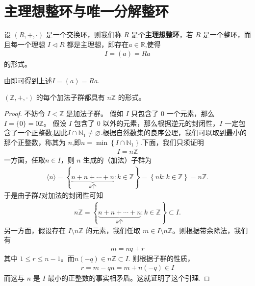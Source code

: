 \documentclass[../../main.tex]{subfiles}
\begin{document}
\section{主理想整环与唯一分解整环}

\begin{definition}[主理想整环]
设 $(R, +, \cdot)$ 是一个交换环，则我们称 $R$ 是个\textbf{主理想整环}，若 $R$ 是一个整环，而且每一个理想 $I \lhd R$ 都是主理想，即存在$a\in \mathbb{R}$,使得
\begin{align*}
I = (a) = Ra
\end{align*}
的形式。
\end{definition}
\begin{remark}
由即可得到上述$I = (a) = Ra.$
\end{remark}

\begin{lemma}\label{lemma:整数环的每个加法子群都是nZ}
$(\mathbb{Z}, +, \cdot)$ 的每个加法子群都具有 $n\mathbb{Z}$ 的形式。
\end{lemma}
\begin{proof}
不妨令 $I < \mathbb{Z}$ 是加法子群。
假如 $I$ 只包含了 $0$ 一个元素，那么 $I = \{0\} = 0\mathbb{Z}$。
假设 $I$ 包含了 $0$ 以外的元素，那么根据逆元的封闭性，$I$ 一定包含了一个正整数,因此$I\cap \mathbb{N} _1\ne \varnothing $.根据自然数集的良序公理，我们可以取到最小的那个正整数，称其为 $n$,即$n=\min \left\{ I\cap \mathbb{N} _1 \right\}$.下面，我们只须证明
\begin{align*}
I = n\mathbb{Z}
\end{align*}
一方面，任取$n \in I$，则 $n$ 生成的（加法）子群为
\begin{align*}
\langle n\rangle =\left\{ \underset{k\text{个}}{\underbrace{n+n+\cdots +n}}:k\in \mathbb{Z} \right\} =\left\{ nk:k\in \mathbb{Z} \right\} =n\mathbb{Z} .
\end{align*}
于是由子群$I$对加法的封闭性可知
\begin{align*}
n\mathbb{Z} =\left\{ \underset{k\text{个}}{\underbrace{n+n+\cdots +n}}:k\in \mathbb{Z} \right\} \subset I.
\end{align*}
另一方面，假设存在 $I \setminus n\mathbb{Z}$ 的元素，我们任取 $m \in I \setminus n\mathbb{Z}$。则根据带余除法，我们有
\begin{align*}
m = nq + r
\end{align*}
其中 $1 \leqslant r \leqslant n - 1$。而$n(-q)\in n\mathbb{Z}\subset I$.
则根据子群的性质，
\begin{align*}
r = m - qn = m + n(-q) \in I
\end{align*}
而这与 $n$ 是 $I$ 最小的正整数的事实相矛盾。这就证明了这个引理.
\end{proof}
\end{document}
